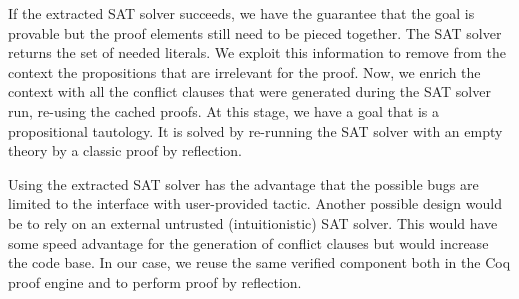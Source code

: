 \documentclass[utf8,a4paper,UKenglish,cleveref, autoref, thm-restate]{lipics-v2019}
\begin{document}
If the extracted SAT solver succeeds, we have the guarantee that the
goal is provable but the proof elements still need to be pieced together.
%
The SAT solver returns the set of needed literals.  We exploit this
information to remove from the context the propositions that are
irrelevant for the proof.
%
Now, we enrich the context with all the conflict clauses that were
generated during the SAT solver run, re-using the cached proofs.  At
this stage, we have a goal that is a propositional tautology.  It is
solved by re-running the SAT solver with an empty theory by a classic
proof by reflection.

Using the extracted SAT solver has the advantage that the possible
bugs are limited to the interface with user-provided tactic.
%
Another possible design would be to rely on an external untrusted
(intuitionistic) SAT solver. This would have some speed advantage for
the generation of conflict clauses but would increase the code
base. In our case, we reuse the same verified component both in the
Coq proof engine and to perform proof by reflection.



\end{document}
